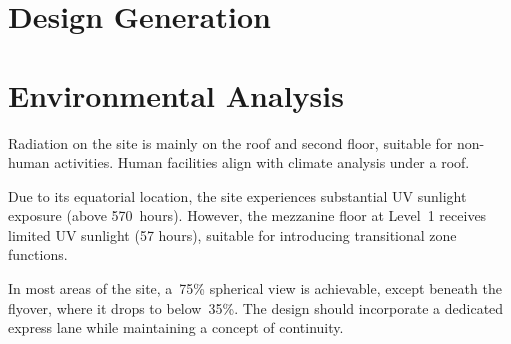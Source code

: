 \section*{
  Design Generation
 }

\vfill
\section*{
  Environmental Analysis
 }
\setlength{\columnsep}{0.5cm}
\begin{multicols}{3}
	
	Radiation on the site is mainly on the roof and second floor, suitable for non-human activities. Human facilities align with climate analysis under a roof.
	\columnbreak%
	
	Due to its equatorial location, the site experiences substantial UV sunlight exposure (above 570~hours). However, the mezzanine floor at Level~1 receives limited UV sunlight (57 hours), suitable for introducing transitional zone functions.
	\columnbreak%
	
	In most areas of the site, a~75\% spherical view is achievable, except beneath the flyover, where it drops to below~35\%. The design should incorporate a dedicated express lane while maintaining a concept of continuity.
\end{multicols}
\columnbreak%

